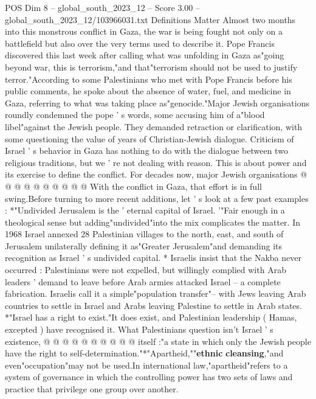 \begin{textsample}{POS Dim 8 – global\_south\_2023\_12 – Score 3.00 – global\_south\_2023\_12/103966031.txt}  \label{ex:f8_pos_437}
Definitions Matter Almost two months into this monstrous conflict in Gaza, the war is being fought not only on a battlefield but also over the very terms used to describe it.
Pope Francis discovered this last week after calling what was unfolding in Gaza as"going beyond war, this is terrorism,"and that"terrorism should not be used to justify terror."According to some Palestinians who met with Pope Francis before his public comments, he spoke about the absence of water, fuel, and medicine in Gaza, referring to what was taking place as"genocide."Major Jewish organisations roundly condemned the pope ' s words, some accusing him of a"blood libel"against the Jewish people.
They demanded retraction or clarification, with some questioning the value of years of Christian-Jewish dialogue.
Criticism of Israel ' s behavior in Gaza has nothing to do with the dialogue between two religious traditions, but we ' re not dealing with reason.
This is about power and its exercise to define the conflict.
For decades now, major Jewish organisations @ @ @ @ @ @ @ @ @ @ With the conflict in Gaza, that effort is in full swing.Before turning to more recent additions, let ' s look at a few past examples : *"Undivided Jerusalem is the ' eternal capital of Israel. '"Fair enough in a theological sense but adding"undivided"into the mix complicates the matter.
In 1968 Israel annexed 28 Palestinian villages to the north, east, and south of Jerusalem unilaterally defining it as"Greater Jerusalem"and demanding its recognition as Israel ' s undivided capital. * Israelis insist that the Nakba never occurred : Palestinians were not expelled, but willingly complied with Arab leaders ' demand to leave before Arab armies attacked Israel -- a complete fabrication.
Israelis call it a simple"population transfer"-- with Jews leaving Arab countries to settle in Israel and Arabs leaving Palestine to settle in Arab states. *"Israel has a right to exist."It does exist, and Palestinian leadership ( Hamas, excepted ) have recognised it.
What Palestinians question isn't Israel ' s existence, @ @ @ @ @ @ @ @ @ @ itself :"a state in which only the Jewish people have the right to self-determination."*"Apartheid,""\textbf{ethnic} \textbf{cleansing},"and even"occupation"may not be used.In international law,"apartheid"refers to a system of governance in which the controlling power has two sets of laws and practice that privilege one group over another.

\end{textsample}
